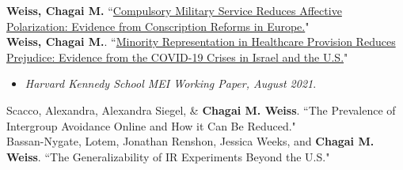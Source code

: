 \documentclass[11pt]{article}
\begin{document}
\textbf{Weiss, Chagai M.} ``\href{https://www.chagaiweiss.com/papers/inprogress/weiss_conscription.pdf}{Compulsory Military Service Reduces Affective Polarization: Evidence from Conscription Reforms in Europe.}" \\


\textbf{Weiss, Chagai M.}. ``\href{https://www.chagaiweiss.com/papers/inprogress/mei_diveristy.pdf}{Minority Representation in Healthcare Provision Reduces Prejudice: Evidence from the COVID-19 Crises in Israel and the U.S.}"
         \begin{itemize}[label=$\bullet$]
 \item \emph{Harvard Kennedy School MEI Working Paper, August 2021}.
	 \end{itemize} 	

Scacco, Alexandra, Alexandra Siegel, \& \textbf{Chagai M. Weiss}. ``The Prevalence of Intergroup Avoidance Online and How it Can Be Reduced."\\

Bassan-Nygate, Lotem, Jonathan Renshon, Jessica Weeks, and \textbf{Chagai M. Weiss}. ``The Generalizability of IR Experiments Beyond the U.S." 
 

               

 
     
                       
\end{document}
